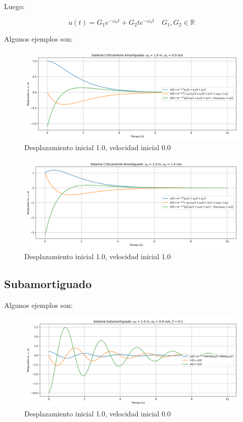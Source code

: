 \documentclass{article}  %
\begin{document}
Luego:

\begin{equation}
    u(t) = G_1e^{-\omega_n t} + G_2te^{-\omega_n t} \quad G_1, G_2 \in \mathbb{R}
\end{equation}

Algunos ejemplos son:
\begin{figure}[H]
    \centering
    \includegraphics[width=1\textwidth]{GRAFICOS/sis_criticamente_amortiguado_u0_1.0_v0_0.0.png}
    \caption{Desplazamiento inicial 1.0, velocidad inicial 0.0}
    \label{fig:ejemplo1}
\end{figure}

\begin{figure}[H]
    \centering
    \includegraphics[width=1\textwidth]{GRAFICOS/sis_criticamente_amortiguado_u0_1.0_v0_1.0.png}
    \caption{Desplazamiento inicial 1.0, velocidad inicial 1.0}
    \label{fig:ejemplo1}
\end{figure}

\subsection{Subamortiguado}

Algunos ejemplos son:

\begin{figure}[H]
    \centering
    \includegraphics[width=1\textwidth]{GRAFICOS/sis_subamortiguado_u0_1.0_v0_0.0_zeta_0.1.png}
    \caption{Desplazamiento inicial 1.0, velocidad inicial 0.0}
    \label{fig:ejemplo1}
\end{figure}
\end{document}
